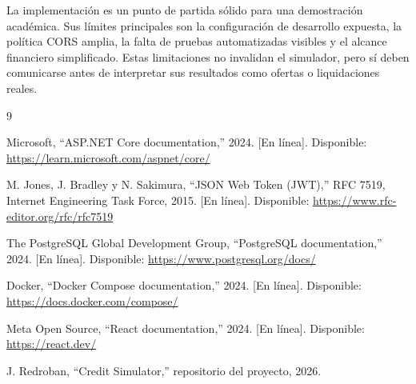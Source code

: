 \documentclass[12pt,a4paper]{article}
\begin{document}
La implementación es un punto de partida sólido para una demostración
académica. Sus límites principales son la configuración de desarrollo
expuesta, la política CORS amplia, la falta de pruebas automatizadas visibles
y el alcance financiero simplificado. Estas limitaciones no invalidan el
simulador, pero sí deben comunicarse antes de interpretar sus resultados como
ofertas o liquidaciones reales.

\begin{thebibliography}{9}

Microsoft, ``ASP.NET Core documentation,'' 2024. [En línea].
Disponible: \url{https://learn.microsoft.com/aspnet/core/}

M. Jones, J. Bradley y N. Sakimura, ``JSON Web Token (JWT),'' RFC 7519,
Internet Engineering Task Force, 2015. [En línea].
Disponible: \url{https://www.rfc-editor.org/rfc/rfc7519}

The PostgreSQL Global Development Group, ``PostgreSQL documentation,'' 2024.
[En línea]. Disponible: \url{https://www.postgresql.org/docs/}

Docker, ``Docker Compose documentation,'' 2024. [En línea].
Disponible: \url{https://docs.docker.com/compose/}

Meta Open Source, ``React documentation,'' 2024. [En línea].
Disponible: \url{https://react.dev/}

J. Redroban, ``Credit Simulator,'' repositorio del proyecto, 2026.

\end{thebibliography}
\end{document}
